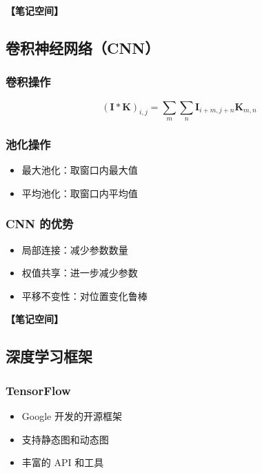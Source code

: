 \documentclass[12pt,a4paper]{article}
\newcommand{\notespace}[1][3cm]{%
  \vspace{#1}%
  \noindent\textbf{【笔记空间】}%
  \vspace{#1}%
}
\newcommand{\1}{\mathbf{1}}
\begin{document}
\notespace[2cm]

\subsection{卷积神经网络（CNN）}

\subsubsection*{卷积操作}

\begin{equation}
(\mathbf{I}*\mathbf{K})_{i,j}=\sum_{m}\sum_{n}\mathbf{I}_{i+m,j+n}\mathbf{K}_{m,n}
\end{equation}

\subsubsection*{池化操作}

\begin{itemize}[leftmargin=2em]
  \item 最大池化：取窗口内最大值
  \item 平均池化：取窗口内平均值
\end{itemize}

\subsubsection*{CNN 的优势}

\begin{keybox}
\begin{itemize}[leftmargin=1.5em]
  \item 局部连接：减少参数数量
  \item 权值共享：进一步减少参数
  \item 平移不变性：对位置变化鲁棒
\end{itemize}
\end{keybox}

\notespace[2cm]

\subsection{深度学习框架}

\subsubsection*{TensorFlow}

\begin{itemize}[leftmargin=2em]
  \item Google 开发的开源框架
  \item 支持静态图和动态图
  \item 丰富的 API 和工具
\end{itemize}
\end{document}
